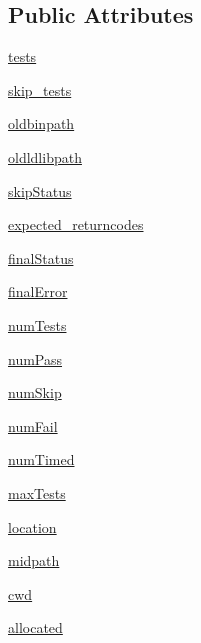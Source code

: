\subsection*{Public Attributes}
\begin{DoxyCompactItemize}
\item 
\hyperlink{class_launcher_m_t_t_tool_1_1_launcher_m_t_t_tool_a2810a82208a2846540adffee0a6855f7}{tests}
\item 
\hyperlink{class_launcher_m_t_t_tool_1_1_launcher_m_t_t_tool_a03696ab743c22417d3be183903c20a68}{skip\-\_\-tests}
\item 
\hyperlink{class_launcher_m_t_t_tool_1_1_launcher_m_t_t_tool_acf34764e2b173537cbf5720cc0a1235d}{oldbinpath}
\item 
\hyperlink{class_launcher_m_t_t_tool_1_1_launcher_m_t_t_tool_abb2e78c53544b045ef3ab42ed8b68806}{oldldlibpath}
\item 
\hyperlink{class_launcher_m_t_t_tool_1_1_launcher_m_t_t_tool_a4d5ba97c121703a52364ba25f4a2546b}{skip\-Status}
\item 
\hyperlink{class_launcher_m_t_t_tool_1_1_launcher_m_t_t_tool_ae68abb344ae827a5ce0ee79446020c63}{expected\-\_\-returncodes}
\item 
\hyperlink{class_launcher_m_t_t_tool_1_1_launcher_m_t_t_tool_a24a3038f22807231f60be1efd39f7bcb}{final\-Status}
\item 
\hyperlink{class_launcher_m_t_t_tool_1_1_launcher_m_t_t_tool_a607ea8851059a23f64f5b1ef4590109e}{final\-Error}
\item 
\hyperlink{class_launcher_m_t_t_tool_1_1_launcher_m_t_t_tool_a397beae73724893629842d0031c64526}{num\-Tests}
\item 
\hyperlink{class_launcher_m_t_t_tool_1_1_launcher_m_t_t_tool_a92a3dc1fd9b7d2e9129d3a0968a871eb}{num\-Pass}
\item 
\hyperlink{class_launcher_m_t_t_tool_1_1_launcher_m_t_t_tool_affd7de54ccbc2c7f78b4afa06728f5e5}{num\-Skip}
\item 
\hyperlink{class_launcher_m_t_t_tool_1_1_launcher_m_t_t_tool_a17fe6e6f8981cc1f7cd1953cac37668a}{num\-Fail}
\item 
\hyperlink{class_launcher_m_t_t_tool_1_1_launcher_m_t_t_tool_ae2be62c3d068b4c1c3d7c1ddaf4cfdbe}{num\-Timed}
\item 
\hyperlink{class_launcher_m_t_t_tool_1_1_launcher_m_t_t_tool_aa8e59ca462ace6b189cd849a08afa639}{max\-Tests}
\item 
\hyperlink{class_launcher_m_t_t_tool_1_1_launcher_m_t_t_tool_a13b93dfdaa7c433967c808d9bf54dcf9}{location}
\item 
\hyperlink{class_launcher_m_t_t_tool_1_1_launcher_m_t_t_tool_a37f255feb0dac2f1eb0e6eff2746bd7b}{midpath}
\item 
\hyperlink{class_launcher_m_t_t_tool_1_1_launcher_m_t_t_tool_a7bcf1056b03f3777ef4ed39f7e063f36}{cwd}
\item 
\hyperlink{class_launcher_m_t_t_tool_1_1_launcher_m_t_t_tool_a79266b94da58ec136cca44c1f735d3a7}{allocated}
\end{DoxyCompactItemize}


